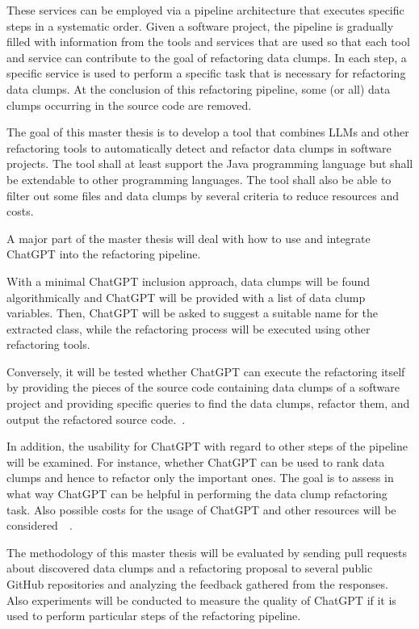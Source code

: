 These services can be employed via a pipeline architecture that executes specific steps in a systematic order.  Given a software project, the pipeline is gradually filled with information from the tools and services that are used so that each tool and service can contribute to the goal of refactoring data clumps.  In each step, a specific service is used to perform a specific task that is necessary for refactoring data clumps. At the conclusion of this refactoring pipeline, some (or all) data clumps occurring in the source code are removed.  




The goal of this master thesis is to develop a tool that combines \acp{LLM} and other refactoring tools to automatically detect and refactor data clumps in software projects. The tool  shall at least support the Java programming language but shall be extendable to  other programming languages. The tool shall also  be able to filter out some files and data clumps by several criteria to reduce resources and costs. 


A major part of the master thesis will deal with how to use and integrate ChatGPT into the refactoring pipeline. 

With a minimal ChatGPT inclusion approach,  data clumps will be found algorithmically  and ChatGPT will be provided with a list of data clump variables. Then, ChatGPT will be  asked to suggest a suitable name for the extracted class, while the refactoring process will be executed using other refactoring tools.


Conversely, it will be tested whether ChatGPT can execute the refactoring itself by providing the pieces of the source code containing data clumps of a software project and providing specific queries to find the data clumps, refactor them, and output the refactored source code.~\cite{White2024}.

In addition, the usability for ChatGPT with regard to other steps of the pipeline will be examined. For instance, whether ChatGPT can be used to rank data clumps and hence to refactor only the important ones. The goal is to assess in what way ChatGPT can be helpful in performing the data clump refactoring task. Also possible costs for the usage of ChatGPT and other resources will be considered~\cite{xia2023conversation}~\cite{a_bot_for_fixing_static}.


The methodology of this master thesis will be evaluated by sending  pull requests about discovered data clumps and a refactoring proposal to several public GitHub repositories and analyzing the feedback gathered from the responses. Also experiments will be conducted to measure the quality of ChatGPT if it is used to perform particular steps of the refactoring pipeline.  

